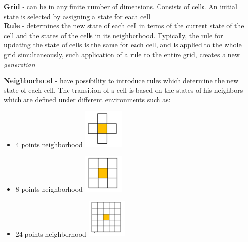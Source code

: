 \documentclass{article}
\begin{document}
\Large {\bf 
	Grid
} 	
	- can be in any finite number of dimensions. Consists of cells.
	An initial state is selected by assigning a state for each cell \\


\Large {\bf Rule
} 
	- determines the new state of each cell in terms of the current state
	of the cell and the states of the cells in its neighborhood.
	Typically, the rule for updating the state of cells is the same for each
	cell, and is applied to the whole grid simultaneously, such application of
	a rule to the entire grid, creates a new \textit{generation} \\

\newpage	

\Large {\bf Neighborhood
} 
	-  have possibility to introduce rules which determine the new state of 
	each cell. The transition of a cell is based on the states of his neighbors which are
	defined under different environments such as:
	\begin{itemize}
	
	\item	
		4 points neighborhood \hspace{35pt} 
			 \includegraphics[width=20mm]{images/4_neigh.png} \\

	\item	
		8 points neighborhood \hspace{35pt}
			\includegraphics[width=20mm]{images/8_neigh.png} \\

	\item	
		24 points neighborhood \hspace{35pt}
			\includegraphics[width=20mm]{images/24_neigh.png} \\				
	\end{itemize}
\end{document}
